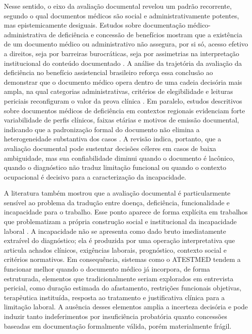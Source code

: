\documentclass[12pt,a4paper]{article}
\begin{document}
Nesse sentido, o eixo da avaliação documental revelou um padrão recorrente, segundo o qual documentos médicos são social e administrativamente potentes, mas epistemicamente desiguais. Estudos sobre documentação médico-administrativa de deficiência e concessão de benefícios mostram que a existência de um documento médico ou administrativo não assegura, por si só, acesso efetivo a direitos, seja por barreiras burocráticas, seja por assimetrias na interpretação institucional do conteúdo documentado \parencite{rajasulochana2026doeshavingadisabilitycertificateensurebenefit}. A análise da trajetória da avaliação da deficiência no benefício assistencial brasileiro reforça essa conclusão ao demonstrar que o documento médico opera dentro de uma cadeia decisória mais ampla, na qual categorias administrativas, critérios de elegibilidade e leituras periciais reconfiguram o valor da prova clínica \parencite{nogueira20200731t0100000100aavaliacaodadeficiencianatraje}. Em paralelo, estudos descritivos sobre documentos médicos de deficiência em contextos regionais evidenciam forte variabilidade de perfis clínicos, faixas etárias e motivos de emissão documental, indicando que a padronização formal do documento não elimina a heterogeneidade substantiva dos casos \parencite{sa2020medicalcertificateofdisabilityadescriptiveanalysisofav, hospital2016mentaldisabilityaretrospectivestudyofsocioclinica}. A revisão indica, portanto, que a avaliação documental pode sustentar decisões céleres em casos de baixa ambiguidade, mas sua confiabilidade diminui quando o documento é lacônico, quando o diagnóstico não traduz limitação funcional ou quando o contexto ocupacional é decisivo para a caracterização da incapacidade.

A literatura também mostrou que a avaliação documental é particularmente sensível ao problema da tradução entre doença, deficiência, funcionalidade e incapacidade para o trabalho. Esse ponto aparece de forma explícita em trabalhos que problematizam a própria construção social e institucional da incapacidade laboral \parencite{dijkstrasdatamakingupincapacityforwork}. A incapacidade não se apresenta como dado bruto imediatamente extraível do diagnóstico; ela é produzida por uma operação interpretativa que articula achados clínicos, exigências laborais, prognóstico, contexto social e critérios normativos. Em consequência, sistemas como o ATESTMED tendem a funcionar melhor quando o documento médico já incorpora, de forma estruturada, elementos que tradicionalmente seriam explorados em entrevista pericial, como duração estimada do afastamento, restrições funcionais objetivas, terapêutica instituída, resposta ao tratamento e justificativa clínica para a limitação laboral. A ausência desses elementos amplia a incerteza decisória e pode induzir tanto indeferimentos por insuficiência probatória quanto concessões baseadas em documentação formalmente válida, porém materialmente frágil.
\end{document}
